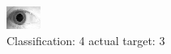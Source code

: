 \begin{figure}[h!]
\begin{center}
\includegraphics[width=0.60\columnwidth]{figures/ID1897_class_4_target_3.png}
\end{center}
\caption{ Classification: 4 actual target: 3}
\label{fig:ID1897_class_4_target_3}
\end{figure}
